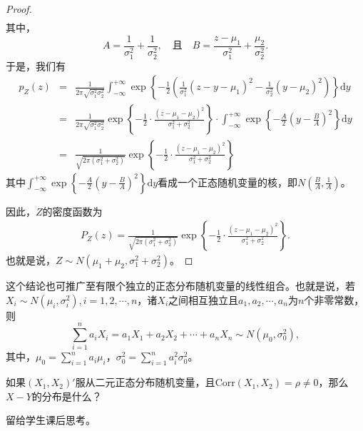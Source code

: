 \begin{proof}
\begin{eqnarray*}
 \end{eqnarray*}
 其中，
 $$
 A = \frac{1}{\sigma_1^2} + \frac{1}{\sigma_2^2}, \quad \text{且}\quad 
 B = \frac{z-\mu_1}{\sigma_1^2} + \frac{\mu_2}{\sigma_2^2}.
 $$
于是，我们有
\begin{eqnarray*}
    p_{Z}(z)&=&\frac{1}{2 \pi \sqrt{\sigma_{1}^{2} \sigma_{2}^{2}}} \int_{-\infty}^{+\infty} \exp \left\{-\frac{1}{2}\left(\frac{1}{ \sigma_{1}^{2}}\left(z-y-\mu_{1}\right)^{2} -\frac{1}{\sigma_{2}^{2}}\left(y-\mu_{2}\right)^{2}\right)\right\} \text{d} y
    \\
    &=&\frac{1}{2 \pi \sqrt{\sigma_{1}^{2} \sigma_{2}^{2}}} \exp \left\{-\frac{1}{2} \cdot\frac{\left(z-\mu_{1}-\mu_{2}\right)^{2}}{\sigma_{1}^{2}+\sigma_{2}^{2}}\right\} \cdot \int_{-\infty}^{+\infty} \exp \left\{-\frac{A}{2}\left(y-\frac{B}{A}\right)^{2}\right\} \text{d} y \\
    &=&\frac{1}{\sqrt{2 \pi (\sigma_{1}^{2} +\sigma_{2}^{2})}} \exp \left\{-\frac{1}{2} \cdot \frac{\left(z-\mu_{1}-\mu_{2}\right)^{2}}{\sigma_{1}^{2}+\sigma_{2}^{2}}\right\}
\end{eqnarray*}
其中$\int_{-\infty}^{+\infty} \exp \left\{-\frac{A}{2}\left(y-\frac{B}{A}\right)^{2}\right\} \text{d} y$看成一个正态随机变量的核，即$N\left(\frac{B}{A}, \frac{1}{A}\right)$。

因此，$Z$的密度函数为
\begin{eqnarray*}
P_{Z}(z) =\frac{1}{\sqrt{2 \pi\left(\sigma_{1}^{2}+\sigma_{2}^{2}\right)}} \exp \left\{-\frac{1}{2} \cdot \frac{\left(z-\mu_{1}-\mu_{2}\right)^{2}}{\sigma_{1}^{2}+\sigma_{2}^{2}}\right\}.
\end{eqnarray*}
也就是说，$Z \sim N\left(\mu_{1}+\mu_{2}, \sigma_{1}^{2}+\sigma_{2}^{2}\right)$。
\end{proof}
\begin{remark}
 这个结论也可推广至有限个独立的正态分布随机变量的线性组合。也就是说，若$X_i\sim N(\mu_i,\sigma_i^2),i=1,2,\cdots,n$，诸$X_i$之间相互独立且$a_1,a_2,\cdots,a_n$为$n$个非零常数，则
    $$
    \sum_{i=1}^n a_i X_i = a_1X_1+a_2X_2+\cdots+a_nX_n\sim N(\mu_0,\sigma_0^2),
    $$
    其中，$\mu_0 = \sum_{i=1}^n a_i \mu_i$，$\sigma_0^2 = \sum_{i=1}^n a_i^2 \sigma_0^2$。
\end{remark}

\begin{problem}
    如果$(X_1,X_2)'$服从二元正态分布随机变量，且$\text{Corr}(X_1,X_2) = \rho \neq 0$，那么$X-Y$的分布是什么？
\end{problem}
\begin{note}
留给学生课后思考。
\vspace{5cm}
\end{note}

